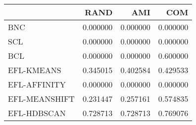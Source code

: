 \begin{tabular}{lrrr}
\toprule
 & RAND & AMI & COM \\
\midrule
BNC & 0.000000 & 0.000000 & 0.000000 \\
SCL & 0.000000 & 0.000000 & 0.000000 \\
BCL & 0.000000 & 0.000000 & 0.600000 \\
EFL-KMEANS & 0.345015 & 0.402584 & 0.429533 \\
EFL-AFFINITY & 0.000000 & 0.000000 & 0.000000 \\
EFL-MEANSHIFT & 0.231447 & 0.257161 & 0.574835 \\
EFL-HDBSCAN & 0.728713 & 0.728713 & 0.769076 \\
\bottomrule
\end{tabular}
